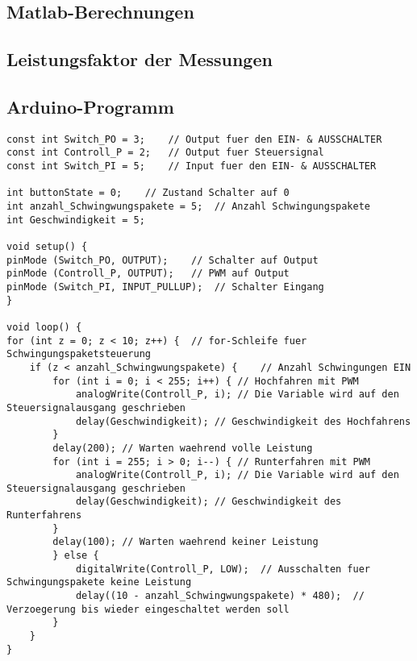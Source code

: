 \begin{appendix} %
\section{Matlab-Berechnungen}
%
\subsection{Leistungsfaktor der Messungen}\label{sec:Leistungsfaktor_Messungen}




\newpage
\subsection{Arduino-Programm}
\begin{lstlisting}[basicstyle=\tiny,style=myArduino]
const int Switch_PO = 3;	// Output fuer den EIN- & AUSSCHALTER
const int Controll_P = 2;	// Output fuer Steuersignal
const int Switch_PI = 5;	// Input fuer den EIN- & AUSSCHALTER

int buttonState = 0;	// Zustand Schalter auf 0
int anzahl_Schwingwungspakete = 5;	// Anzahl Schwingungspakete
int Geschwindigkeit = 5;

void setup() {
pinMode (Switch_PO, OUTPUT);	// Schalter auf Output
pinMode (Controll_P, OUTPUT);	// PWM auf Output
pinMode (Switch_PI, INPUT_PULLUP);	// Schalter Eingang
}

void loop() {
for (int z = 0; z < 10; z++) {	// for-Schleife fuer Schwingungspaketsteuerung
	if (z < anzahl_Schwingwungspakete) {	// Anzahl Schwingungen EIN
		for (int i = 0; i < 255; i++) {	// Hochfahren mit PWM
			analogWrite(Controll_P, i);	// Die Variable wird auf den Steuersignalausgang geschrieben
			delay(Geschwindigkeit);	// Geschwindigkeit des Hochfahrens
		}
		delay(200);	// Warten waehrend volle Leistung
		for (int i = 255; i > 0; i--) {	// Runterfahren mit PWM
			analogWrite(Controll_P, i);	// Die Variable wird auf den Steuersignalausgang geschrieben
			delay(Geschwindigkeit);	// Geschwindigkeit des Runterfahrens
		}
		delay(100);	// Warten waehrend keiner Leistung
		} else {
			digitalWrite(Controll_P, LOW);	// Ausschalten fuer Schwingungspakete keine Leistung
			delay((10 - anzahl_Schwingwungspakete) * 480);	// Verzoegerung bis wieder eingeschaltet werden soll
		}
	}
}






\end{lstlisting}
\end{appendix}
